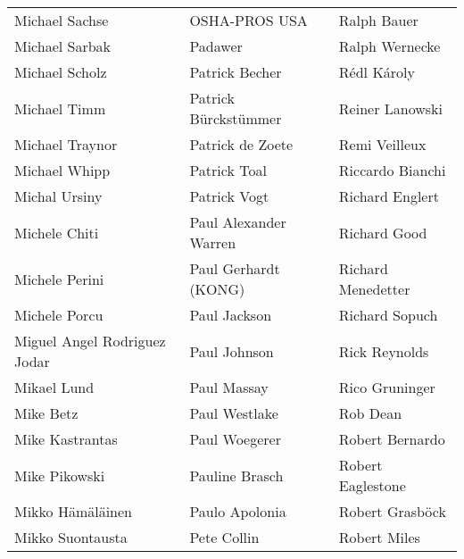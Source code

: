 \begin{tabular}{p{4.5cm}p{4.5cm}p{4.5cm}}
Michael Sachse & OSHA-PROS USA & Ralph Bauer \\
Michael Sarbak & Padawer & Ralph Wernecke \\
Michael Scholz & Patrick Becher & Rédl Károly \\
Michael Timm & Patrick Bürckstümmer & Reiner Lanowski \\
Michael Traynor & Patrick de Zoete & Remi Veilleux \\
Michael Whipp & Patrick Toal & Riccardo Bianchi \\
Michal Ursiny & Patrick Vogt & Richard Englert \\
Michele Chiti & Paul Alexander Warren & Richard Good \\
Michele Perini & Paul Gerhardt (KONG) & Richard Menedetter \\
Michele Porcu & Paul Jackson & Richard Sopuch \\
Miguel Angel Rodriguez Jodar & Paul Johnson & Rick Reynolds \\
Mikael Lund & Paul Massay & Rico Gruninger \\
Mike Betz & Paul Westlake & Rob Dean \\
Mike Kastrantas & Paul Woegerer & Robert Bernardo \\
Mike Pikowski & Pauline Brasch & Robert Eaglestone \\
Mikko Hämäläinen & Paulo Apolonia & Robert Grasböck \\
Mikko Suontausta & Pete Collin & Robert Miles \\
\end{tabular}
\newpage
\setlength{\tabcolsep}{1mm}
